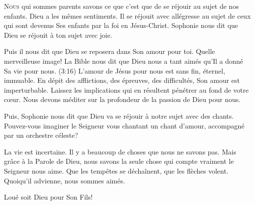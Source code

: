 \lettrine{N}{ous} qui sommes parents savons ce que c'est que de se réjouir
 au sujet de nos enfants. Dieu a les mêmes sentiments.
 Il se réjouit avec allégresse au sujet de ceux qui sont devenus
 Ses enfants par la foi en Jésus-Christ. Sophonie nous dit que
 \Og Dieu se réjouit à ton sujet avec joie. \Fg{}

Puis il nous dit que Dieu \Og se reposera dans Son amour pour toi. \Fg{}
 Quelle merveilleuse image! La Bible nous dit que Dieu nous a tant aimés
 qu'Il a donné Sa vie pour nous. (3:16)
 L'amour de Jésus pour nous est sans fin, éternel, immuable.
 En dépit des afflictions, des épreuves, des difficultés,
 Son amour est imperturbable. Laissez les implications qui en résultent
 pénétrer  au fond de votre c\oe{}ur.
 Nous devons méditer sur la profondeur de la passion de Dieu pour nous. 


Puis, Sophonie nous dit que Dieu va \Og se réjouir à notre sujet
 avec des chants. \Fg{} Pouvez-vous imaginer le Seigneur vous chantant
 un chant d'amour, accompagné par un orchestre céleste? 

La vie est incertaine. Il y a beaucoup de choses que nous ne savons pas.
 Mais grâce à la Parole de Dieu, nous savons la seule chose
 qui compte vraiment\frcolon{} le Seigneur nous aime. Que les tempêtes se déchaînent,
 que les flèches volent. Quoiqu'il advienne, nous sommes aimés. 

Loué soit Dieu pour Son Fils! 

\dvrule






